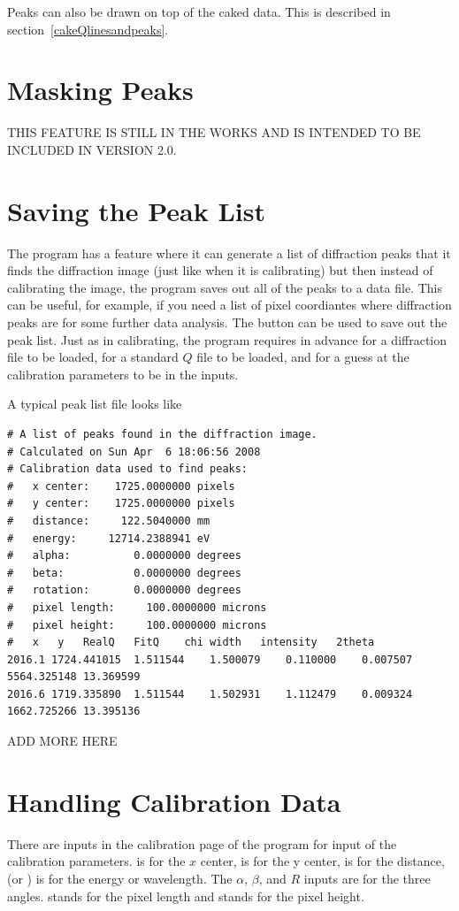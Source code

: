 Peaks can also be drawn on top of the caked data. This 
is described in section~\ref{cakeQlinesandpeaks}.

\section{Masking Peaks}

THIS FEATURE IS STILL IN THE WORKS AND IS INTENDED
TO BE INCLUDED IN VERSION 2.0. 

\section{Saving the Peak List}

The program has a feature where it can generate
a list of diffraction peaks that it finds the 
diffraction image (just like when it is calibrating)
but then instead of calibrating the image, the program
saves out all of the peaks to a data file. This can
be useful, for example, if you need a list of pixel 
coordiantes where diffraction peaks are for some further
data analysis. The  button can
be used to save out the peak list. Just as in calibrating,
the program requires in advance for a diffraction file to
be loaded, for a standard $Q$ file to be loaded, and for
a guess at the calibration parameters to be in the inputs.

A typical peak list file looks like
\begin{lstlisting}[caption={A Peak List File,basicstyle=\ttfamily\tiny}]
# A list of peaks found in the diffraction image.
# Calculated on Sun Apr  6 18:06:56 2008
# Calibration data used to find peaks:
#   x center:    1725.0000000 pixels
#   y center:    1725.0000000 pixels
#   distance:     122.5040000 mm
#   energy:     12714.2388941 eV
#   alpha:          0.0000000 degrees
#   beta:           0.0000000 degrees
#   rotation:       0.0000000 degrees
#   pixel length:     100.0000000 microns
#   pixel height:     100.0000000 microns
#	x	y	RealQ	FitQ	chi	width	intensity	2theta
2016.1 1724.441015	1.511544	1.500079	0.110000	0.007507	5564.325148	13.369599
2016.6 1719.335890	1.511544	1.502931	1.112479	0.009324	1662.725266	13.395136
\end{lstlisting}
ADD MORE HERE

\section{Handling Calibration Data}

There are inputs in the calibration page of the
program for input of the calibration parameters.
 is for the $x$ center,  is
for the y center,  is for the distance,
 (or \gui{$\lambda$:}) is for the energy
or wavelength. The $\alpha$, $\beta$, and
$R$ inputs are for the three angles. 
 stands for the pixel length
and  stands for the pixel height.

